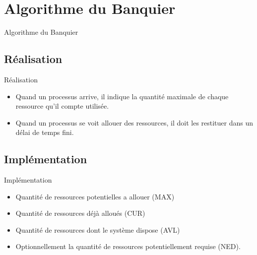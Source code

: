 \def\sectitle{Algorithme du Banquier}
\section{\sectitle}
\begin{frame}{\sectitle}
\def\subsectitle{Réalisation}
\subsection{\subsectitle}
\begin{block}{\subsectitle}
\begin{itemize}
    \item Quand un processus arrive, il indique la quantité maximale de chaque
    ressource qu'il compte utilisée.
    \item Quand un processus se voit allouer des ressources, il doit les
    restituer dans un délai de temps fini.
\end{itemize}
\end{block}
\def\subsectitle{Implémentation}
\subsection{\subsectitle}
\begin{block}{\subsectitle}
\begin{itemize}
    \item Quantité de ressources potentielles a allouer (MAX)
    \item Quantité de ressources déjà alloués (CUR)
    \item Quantité de ressources dont le système dispose (AVL)
    \item Optionnellement la quantité de ressources potentiellement requise (NED).
\end{itemize}
\end{block}
\end{frame}

